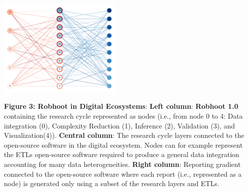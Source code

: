 \documentclass[10pt, a4paper, twocolumn]{article} %
\begin{document}
{\includegraphics[width=0.45\textwidth]{FigureRobhoot.pdf}

{\small {\bf Figure 3: Robhoot in Digital Ecosystems}: {\bf Left
    column}: {\bf Robhoot 1.0} containing the research cycle
  represented as nodes (i.e., from node 0 to 4: Data integration (0),
  Complexity Reduction (1), Inference (2), Validation (3), and
  Visualization(4)). {\bf Central column}: The research cycle layers
  connected to the open-source software in the digital
  ecosystem. Nodes can for example represent the ETLs open-source
  software required to produce a general data integration accounting
  for many data heterogeneities. {\bf Right column}: Reporting
  gradient connected to the open-source software where each report
  (i.e., represented as a node) is generated only using a subset of
  the research layers and ETLs.}




}
\end{document}
